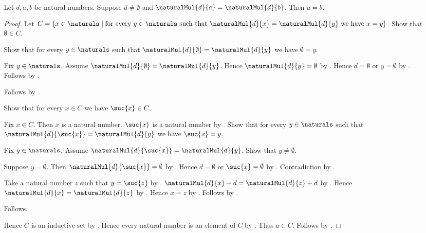 \begin{theorem}\label{spike15_natural_multiplication_cancel_left}
    Let $d,a,b$ be natural numbers.
    Suppose $d\neq\emptyset$ and
        $\naturalMul{d}{a}=\naturalMul{d}{b}$.
    Then $a=b$.
\end{theorem}
\begin{proof}
    Let $C=\{x\in\naturals\mid
        \text{for every $y\in\naturals$ such that
            $\naturalMul{d}{x}=\naturalMul{d}{y}$ we have $x=y$}\}$.
    Show that $\emptyset\in C$.
    \begin{subproof}
        Show that for every $y\in\naturals$ such that
            $\naturalMul{d}{\emptyset}=\naturalMul{d}{y}$
            we have $\emptyset=y$.
        \begin{subproof}
            Fix $y\in\naturals$.
            Assume $\naturalMul{d}{\emptyset}=\naturalMul{d}{y}$.
            Hence $\naturalMul{d}{y}=\emptyset$
                by .
            Hence $d=\emptyset$ or $y=\emptyset$
                by .
            Follows by \auto.
        \end{subproof}
        Follows by .
    \end{subproof}
    Show that for every $x\in C$ we have $\suc{x}\in C$.
    \begin{subproof}
        Fix $x\in C$.
        Then $x$ is a natural number.
        $\suc{x}$ is a natural number by .
        Show that for every $y\in\naturals$ such that
            $\naturalMul{d}{\suc{x}}=\naturalMul{d}{y}$
            we have $\suc{x}=y$.
        \begin{subproof}
            Fix $y\in\naturals$.
            Assume $\naturalMul{d}{\suc{x}}=\naturalMul{d}{y}$.
            Show that $y\neq\emptyset$.
            \begin{subproof}
                Suppose $y=\emptyset$.
                Then $\naturalMul{d}{\suc{x}}=\emptyset$
                    by .
                Hence $d=\emptyset$ or $\suc{x}=\emptyset$
                    by .
                Contradiction by .
            \end{subproof}
            Take a natural number $z$ such that $y=\suc{z}$
                by .
            $\naturalMul{d}{x}+d=\naturalMul{d}{z}+d$
                by .
            Hence $\naturalMul{d}{x}=\naturalMul{d}{z}$
                by .
            Hence $x=z$ by \auto.
            Follows by \auto.
        \end{subproof}
        Follows.
    \end{subproof}
    Hence $C$ is an inductive set by .
    Hence every natural number is an element of $C$
        by .
    Thus $a\in C$.
    Follows by \auto.
\end{proof}


